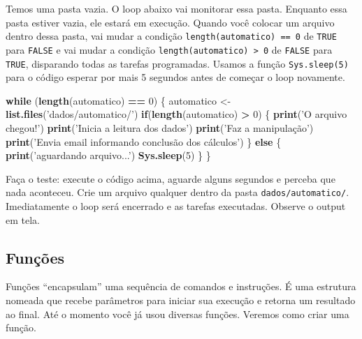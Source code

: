 \documentclass[]{book}
\newenvironment{Shaded}{\begin{snugshade}}{\end{snugshade}}
\newcommand{\KeywordTok}[1]{\textcolor[rgb]{0.13,0.29,0.53}{\textbf{#1}}}
\newcommand{\DecValTok}[1]{\textcolor[rgb]{0.00,0.00,0.81}{#1}}
\newcommand{\StringTok}[1]{\textcolor[rgb]{0.31,0.60,0.02}{#1}}
\newcommand{\ControlFlowTok}[1]{\textcolor[rgb]{0.13,0.29,0.53}{\textbf{#1}}}
\newcommand{\OperatorTok}[1]{\textcolor[rgb]{0.81,0.36,0.00}{\textbf{#1}}}
\newcommand{\NormalTok}[1]{#1}
\begin{document}
Temos uma pasta vazia. O loop abaixo vai monitorar essa pasta. Enquanto
essa pasta estiver vazia, ele estará em execução. Quando você colocar um
arquivo dentro dessa pasta, vai mudar a condição
\texttt{length(automatico)\ ==\ 0} de \texttt{TRUE} para \texttt{FALSE}
e vai mudar a condição \texttt{length(automatico)\ \textgreater{}\ 0} de
\texttt{FALSE} para \texttt{TRUE}, disparando todas as tarefas
programadas. Usamos a função \texttt{Sys.sleep(5)} para o código esperar
por mais 5 segundos antes de começar o loop novamente.

\begin{Shaded}
\begin{Highlighting}[]
\ControlFlowTok{while}\NormalTok{ (}\KeywordTok{length}\NormalTok{(automatico) }\OperatorTok{==}\StringTok{ }\DecValTok{0}\NormalTok{) \{}
\NormalTok{  automatico <-}\StringTok{ }\KeywordTok{list.files}\NormalTok{(}\StringTok{'dados/automatico/'}\NormalTok{)}
  \ControlFlowTok{if}\NormalTok{(}\KeywordTok{length}\NormalTok{(automatico) }\OperatorTok{>}\StringTok{ }\DecValTok{0}\NormalTok{) \{}
    \KeywordTok{print}\NormalTok{(}\StringTok{'O arquivo chegou!'}\NormalTok{)}
    \KeywordTok{print}\NormalTok{(}\StringTok{'Inicia a leitura dos dados'}\NormalTok{)}
    \KeywordTok{print}\NormalTok{(}\StringTok{'Faz a manipulação'}\NormalTok{)}
    \KeywordTok{print}\NormalTok{(}\StringTok{'Envia email informando conclusão dos cálculos'}\NormalTok{)}
\NormalTok{  \} }\ControlFlowTok{else}\NormalTok{ \{}
    \KeywordTok{print}\NormalTok{(}\StringTok{'aguardando arquivo...'}\NormalTok{)}
    \KeywordTok{Sys.sleep}\NormalTok{(}\DecValTok{5}\NormalTok{)}
\NormalTok{  \}}
\NormalTok{\}}
\end{Highlighting}
\end{Shaded}

Faça o teste: execute o código acima, aguarde alguns segundos e perceba
que nada aconteceu. Crie um arquivo qualquer dentro da pasta
\texttt{dados/automatico/}. Imediatamente o loop será encerrado e as
tarefas executadas. Observe o output em tela.

\subsection{Funções}\label{funcoes-1}

Funções ``encapsulam'' uma sequência de comandos e instruções. É uma
estrutura nomeada que recebe parâmetros para iniciar sua execução e
retorna um resultado ao final. Até o momento você já usou diversas
funções. Veremos como criar uma função.
\end{document}
